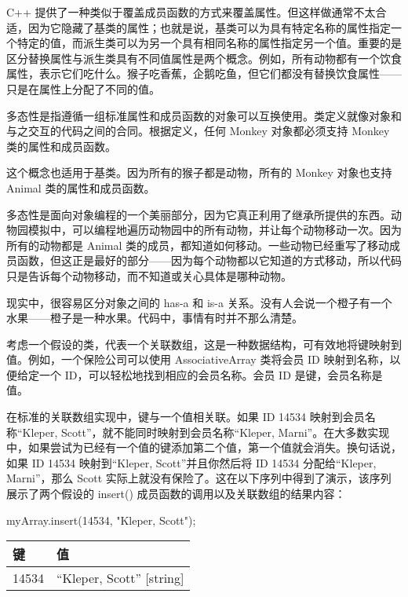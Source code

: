 
C++ 提供了一种类似于覆盖成员函数的方式来覆盖属性。但这样做通常不太合适，因为它隐藏了基类的属性；也就是说，基类可以为具有特定名称的属性指定一个特定的值，而派生类可以为另一个具有相同名称的属性指定另一个值。重要的是区分替换属性与派生类具有不同值属性是两个概念。例如，所有动物都有一个饮食属性，表示它们吃什么。猴子吃香蕉，企鹅吃鱼，但它们都没有替换饮食属性——只是在属性上分配了不同的值。


多态性是指遵循一组标准属性和成员函数的对象可以互换使用。类定义就像对象和与之交互的代码之间的合同。根据定义，任何 Monkey 对象都必须支持 Monkey 类的属性和成员函数。

这个概念也适用于基类。因为所有的猴子都是动物，所有的 Monkey 对象也支持 Animal 类的属性和成员函数。

多态性是面向对象编程的一个美丽部分，因为它真正利用了继承所提供的东西。动物园模拟中，可以编程地遍历动物园中的所有动物，并让每个动物移动一次。因为所有的动物都是 Animal 类的成员，都知道如何移动。一些动物已经重写了移动成员函数，但这正是最好的部分——因为每个动物都以它知道的方式移动，所以代码只是告诉每个动物移动，而不知道或关心具体是哪种动物。


现实中，很容易区分对象之间的 has-a 和 is-a 关系。没有人会说一个橙子有一个水果——橙子是一种水果。代码中，事情有时并不那么清楚。

考虑一个假设的类，代表一个关联数组，这是一种数据结构，可有效地将键映射到值。例如，一个保险公司可以使用 AssociativeArray 类将会员 ID 映射到名称，以便给定一个 ID，可以轻松地找到相应的会员名称。会员 ID 是键，会员名称是值。

在标准的关联数组实现中，键与一个值相关联。如果 ID 14534 映射到会员名称“Kleper, Scott”，就不能同时映射到会员名称“Kleper, Marni”。在大多数实现中，如果尝试为已经有一个值的键添加第二个值，第一个值就会消失。换句话说，如果 ID 14534 映射到“Kleper, Scott”并且你然后将 ID 14534 分配给“Kleper, Marni”，那么 Scott 实际上就没有保险了。这在以下序列中得到了演示，该序列展示了两个假设的 insert() 成员函数的调用以及关联数组的结果内容：

\begin{cpp}
myArray.insert(14534, "Kleper, Scott");
\end{cpp}

\begin{longtable}{|l|l|}
\hline
\textbf{键} & \textbf{值}              \\ \hline
\endfirsthead
%
\endhead
%
14534         & “Kleper, Scott” {[}string{]} \\ \hline
\end{longtable}

